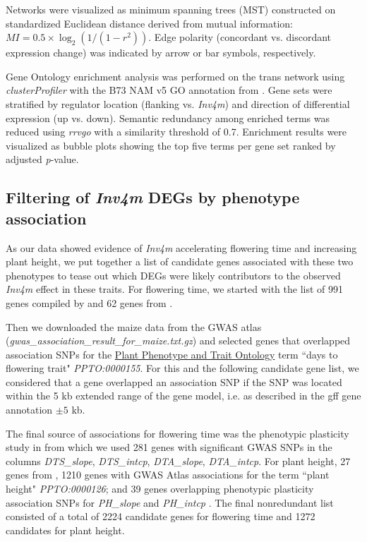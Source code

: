 \documentclass[9pt,twocolumn,twoside]{rilabRxiv}
\newcommand{\invfour}{\textit{Inv4m}\xspace}
\begin{document}
Networks were visualized as minimum spanning trees (MST) constructed on standardized Euclidean distance derived from mutual information: $MI = 0.5 \times \log_2(1/(1-r^2))$.
Edge polarity (concordant vs. discordant expression change) was indicated by arrow or bar symbols, respectively.

Gene Ontology enrichment analysis was performed on the trans network using \textit{clusterProfiler} \cite{yu2012} with the B73 NAM v5 GO annotation from \cite{fattel2024}.
Gene sets were stratified by regulator location (flanking vs. \invfour) and direction of differential expression (up vs. down).
Semantic redundancy among enriched terms was reduced using \textit{rrvgo} \cite{sayols2023} with a similarity threshold of 0.7.
Enrichment results were visualized as bubble plots showing the top five terms per gene set ranked by adjusted \textit{p}-value.


\subsection{Filtering of \invfour DEGs by phenotype association}

As our data showed evidence of \invfour accelerating flowering time and increasing plant height, we put together a list of candidate genes associated with these two phenotypes to tease out which DEGs were likely contributors to the observed \invfour effect in these traits.
For flowering time, we started with the list of 991 genes compiled by \cite{wang2021} and 62 genes from \cite{li2023a}.

Then we downloaded the maize data from the GWAS atlas \cite{liu2023} (\textit{gwas\_association\_result\_for\_maize.txt.gz}) and selected genes that overlapped association SNPs for the \href{https://ngdc.cncb.ac.cn/gwas/browse/ontology}{Plant Phenotype and Trait Ontology} term ``days to flowering trait" \textit{PPTO:0000155}.
For this and the following candidate gene list, we considered that a gene overlapped an association SNP if the SNP was located within the 5 kb extended range of the gene model, i.e. as described in the gff gene annotation $\pm 5$ kb.

The final source of associations for flowering time was the phenotypic plasticity study in \cite{tibbs-cortes2024} from which we used 281 genes with significant GWAS SNPs in the columns \textit{DTS\_slope}, \textit{DTS\_intcp}, \textit{DTA\_slope}, \textit{DTA\_intcp}.
For plant height, 27 genes from \cite{liu2023}, 1210 genes with GWAS Atlas associations for the term ``plant height" \textit{PPTO:0000126}; and 39 genes overlapping phenotypic plasticity association SNPs for \textit{PH\_slope} and \textit{PH\_intcp} \cite{tibbs-cortes2024}.
The final nonredundant list consisted of a total of 2224 candidate genes for flowering time and 1272 candidates for plant height.
\end{document}
